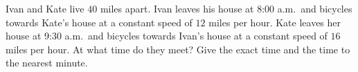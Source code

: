 Ivan and Kate live $40$ miles apart. Ivan leaves his house at 8:00 a.m.\ and bicycles towards Kate's house at a constant speed of $12$ miles per hour. Kate leaves her house at 9:30 a.m.\ and bicycles towards Ivan's house at a constant speed of $16$ miles per hour. At what time do they meet? Give the exact time and the time to the nearest minute.

